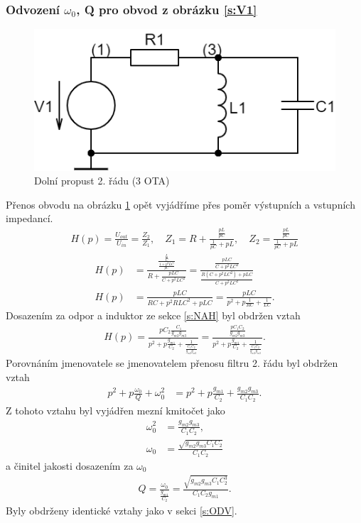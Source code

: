 \subsubsection{Odvození $\omega_0$, Q pro obvod z obrázku \ref{s:V1}}
\begin{figure}[h]
\centering
\includegraphics[scale=0.3]{rlc2(1).png}
\caption{Dolní propust 2. řádu (3 OTA) \label{s:RLC}} 
\end{figure}
\noindent Přenos obvodu na obrázku \ref{s:RLC} opět vyjádříme přes poměr výstupních a vstupních impedancí. 
\begin{align}
H(p) = \frac{U_{out}}{U_{in}} = \frac{Z_2}{Z_1}, \quad Z_1 = R + \frac{\frac{pL}{pC}}{\frac{1}{pC} + pL},\quad Z_2 = \frac{\frac{pL}{pC}}{\frac{1}{pC} + pL}
\end{align}
\begin{align}
H(p) &= \frac{\frac{\frac{L}{C}}{\frac{1 + p^2LC}{pC}}}{R + \frac{pLC}{C + p^2LC^2}} = \frac{\frac{pLC}{C + p^2LC^2}}{\frac{R(C + p^2LC^2) + pLC}{C + p^2LC^2}}\\
H(p) &= \frac{pLC}{RC + p^2RLC^2 + pLC} = \frac{pLC}{p^2 + p\frac{1}{RC} + \frac{1}{LC}}.
\end{align}
\noindent Dosazením za odpor a induktor ze sekce \ref{s:NAH} byl obdržen vztah
\begin{align}
H(p) = \frac{pC_2\frac{C_1}{g_{m2}g_{m3}}}{p^2 + p\frac{g_{m1}}{C_2} + \frac{1}{\frac{C_1C_2}{g_{m2}g_{m3}}}} = \frac{\frac{pC_1C_2}{g_{m2}g_{m3}}}{p^2 + p\frac{g_{m1}}{C_2} + \frac{1}{\frac{C_1C_2}{g_{m2}g_{m3}}}}.
\end{align}
Porovnáním jmenovatele se jmenovatelem přenosu filtru 2. řádu byl obdržen vztah
\begin{align}
p^2 + p\frac{\omega _0}{Q} + \omega _0^2 &= p^2 + p\frac{g_{m1}}{C_2} + \frac{g_{m2}g_{m3}}{C_1C_2}.
\end{align}
Z tohoto vztahu byl vyjádřen mezní kmitočet jako 
\begin{align}
\omega _0^2 &= \frac{g_{m2}g_{m3}}{C_1C_2}, \\
\omega _0 &= \frac{\sqrt{g_{m2}g_{m3}C_1C_2}}{C_1C_2}
\end{align}
a činitel jakosti dosazením za $\omega _0$
\begin{align}
Q = \frac{\omega _0}{\frac{g_{m1}}{C_2}} = \frac{\sqrt{g_{m2}g_{m3}C_1C_2^3}}{C_1C_2g_{m1}}.
\end{align}
Byly obdrženy identické vztahy jako v sekci \ref{s:ODV}.
